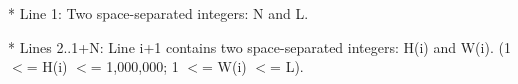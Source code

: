 * Line 1: Two space-separated integers: N and L.

* Lines 2..1+N: Line i+1 contains two space-separated integers: H(i)         and W(i).  (1 $<$= H(i) $<$= 1,000,000; 1 $<$= W(i) $<$= L).